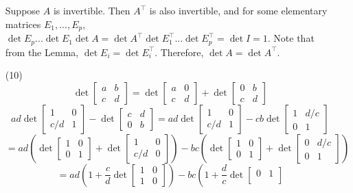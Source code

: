 \documentclass[12pt]{article}
\begin{document}
\begin{itemize}
Suppose $A$ is invertible. Then $A^\top$ is also invertible, and for some elementary matrices $E_1, ..., E_p$, $\det E_p...\det E_1\det A = \det A^\top \det E_1^\top ... \det E_p^\top = \det I = 1$. Note that from the Lemma, $\det E_i = \det E_i^\top$. Therefore, $\det A = \det A^\top$.
\item[(10)]
$$\det\begin{bmatrix}
a & b \\
c & d
\end{bmatrix} = \det\begin{bmatrix}
a & 0 \\
c & d
\end{bmatrix} + \det\begin{bmatrix}
0 & b \\
c & d
\end{bmatrix}$$
$$ad\det\begin{bmatrix}
1 & 0 \\
c/d & 1
\end{bmatrix} - \det\begin{bmatrix}
c & d \\
0 & b
\end{bmatrix} = ad\det\begin{bmatrix}
1 & 0 \\
c/d & 1
\end{bmatrix} - cb\det\begin{bmatrix}
1 & d/c \\
0 & 1
\end{bmatrix}$$
$$= ad\left(\det\begin{bmatrix}
1 & 0 \\
0 & 1
\end{bmatrix} + \det\begin{bmatrix}
1 & 0 \\
c/d & 0
\end{bmatrix}\right) - bc\left(\det\begin{bmatrix}
1 & 0 \\
0 & 1
\end{bmatrix} + \det\begin{bmatrix}
0 & d/c \\
0 & 1
\end{bmatrix}\right)$$
$$= ad\left(1 + \frac{c}{d}\det\begin{bmatrix}
1 & 0 \\
1 & 0
\end{bmatrix}\right) - bc\left(1 + \frac{d}{c}\det\begin{bmatrix}
0 & 1 \\

\end{bmatrix}$$
\end{itemize}
\end{document}
